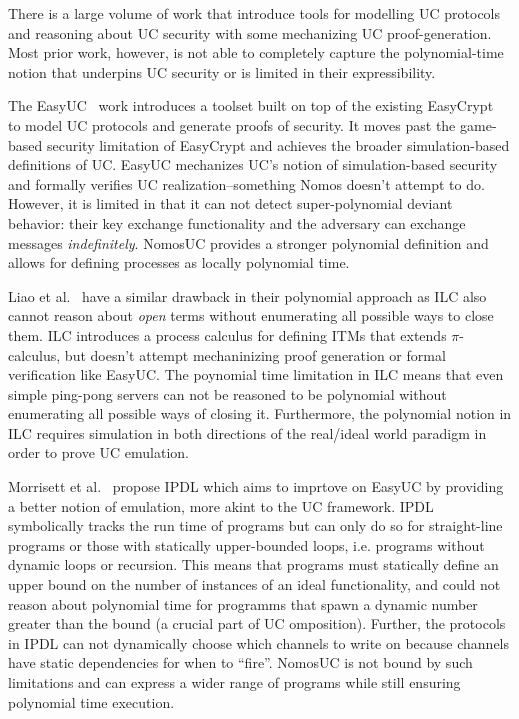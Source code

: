 There is a large volume of work that introduce tools for modelling UC protocols and reasoning about UC security with some mechanizing UC proof-generation.
Most prior work, however, is not able to completely capture the polynomial-time notion that underpins UC security or is limited in their expressibility. 

The EasyUC~\cite{easyuc} work introduces a toolset built on top of the existing EasyCrypt~\cite{easycrypt} to model UC protocols and generate proofs of security.
It moves past the game-based security limitation of EasyCrypt and achieves the broader simulation-based definitions of UC.
EasyUC mechanizes UC's notion of simulation-based security and formally verifies UC realization--something Nomos doesn't attempt to do.
However, it is limited in that it can not detect super-polynomial deviant behavior: their key exchange functionality and the adversary can exchange messages \emph{indefinitely}.
NomosUC provides a stronger polynomial definition and allows for defining processes as locally polynomial time.

Liao et al.~\cite{ilc} have a similar drawback in their polynomial approach as ILC also cannot reason about \emph{open} terms without enumerating all possible ways to close them.
ILC introduces a process calculus for defining ITMs that extends $\pi$-calculus, but doesn't attempt mechaninizing proof generation or formal verification like EasyUC.
The poynomial time limitation in ILC means that even simple ping-pong servers can not be reasoned to be polynomial without enumerating all possible ways of closing it.
Furthermore, the polynomial notion in ILC requires simulation in both directions of the real/ideal world paradigm in order to prove UC emulation.

Morrisett et al.~\cite{ipdl} propose IPDL which aims to imprtove on EasyUC by providing a better notion of emulation, more akint to the UC framework.
IPDL symbolically tracks the run time of programs but can only do so for straight-line programs or those with statically upper-bounded loops, i.e. programs without dynamic loops or recursion. 
This means that programs must statically define an upper bound on the number of instances of an ideal functionality, and could not reason about polynomial time for programms that spawn a dynamic number greater than the bound (a crucial part of UC omposition).
Further, the protocols in IPDL can not dynamically choose which channels to write on because channels have static dependencies for when to ``fire''.
NomosUC is not bound by such limitations and can express a wider range of programs while still ensuring polynomial time execution.


